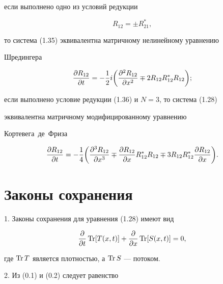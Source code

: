  


если выполнено одно из условий редукции 


\begin{equation} 


R_{12}=\pm R^*_{21}, 


\end{equation} 


то система (1.35) эквивалентна матричному нелинейному уравнению 


Шредингера 


$$ 


\myfrac{R_{12}}{t}=-\frac{1}{2}i\bigg( 


\myfrac{^2R_{12}}{x^2}\mp 2R_{12}R^*_{12}R_{12}\bigg); 


$$ 


 


если выполнено условие редукции (1.36) и $N=3$, то система (1.28) 


эквивалентна матричному модифицированному уравнению  


Кортевега~де~Фриза 


$$ 


\myfrac{R_{12}}{t}=-\frac{1}{4}\bigg( 


\myfrac{^3R_{12}}{x^3}\mp\myfrac{R_{12}}{x} 


R^*_{12}R_{12}\mp 3R_{12}R^*_{12} 


\myfrac{R_{12}}{x}\bigg). 


$$ 


 


\section{Законы сохранения} 


 


1. Законы сохранения для уравнения (1.28) имеют вид 


\begin{equation} 


\myfrac{}{t}\Tr[T(x,t)]+\myfrac{}{x} 


\Tr[S(x,t)]=0, 


\end{equation} 


где $\operatorname{Tr} T$ является плотностью, а $\operatorname{Tr} S$ --- потоком. 


 


2. Из (0.1) и (0.2) следует равенство \cite{5} 


